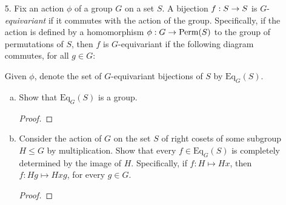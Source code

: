 \begin{itemize}
\begin{enumerate}[(a)]
\item Suppose that $G$ is perfect.
    \begin{enumerate}[(i)]
        \item Prove that $[G, Z_2]$ = $[[G, G], Z_2]$.
        \begin{proof}
        
        \end{proof}
        
        \item Using Parts (a), (c), and (d), prove that $[G, Z_2]$ is trivial.
        \begin{proof}

        \end{proof}

        \item Conclude that $Z_2 = Z(G)$ and that $Z(G/Z(G))$ is trivial.
        \begin{proof}

        \end{proof}
    \end{enumerate}
\end{enumerate}







\item[5.] Fix an action $\phi$ of a group $G$ on a set $S$. A bijection $f : S \rightarrow S$ is $G$-\textit{equivariant} if
it commutes with the action of the group. Specifically, if the action is defined by
a homomorphism $\phi : G \rightarrow \text{Perm}(S)$ to the group of permutations of $S$, then $f$ is
$G$-equivariant if the following diagram commutes, for all $g \in G$:


Given $\phi$, denote the set of $G$-equivariant bijections of $S$ by $\text{Eq}_G(S)$.

\begin{enumerate}[(a)]
\item Show that $\text{Eq}_G(S)$ is a group.
\begin{proof}
        
\end{proof}


\item Consider the action of $G$ on the set $S$ of right cosets of some subgroup
$H \leq G$ by multiplication. Show that every $f \in \text{Eq}_G(S)$ is completely determined by the image of $H$. Specifically, if $f : H \mapsto Hx$, then $f : Hg \mapsto Hxg$,
for every $g \in G$.
\begin{proof}


\end{proof}
\end{enumerate}
\end{itemize}
